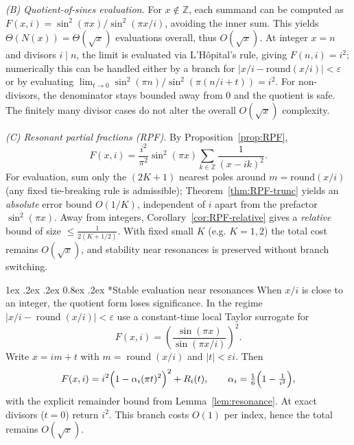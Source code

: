 \documentclass[11pt,a4paper]{amsart}
\makeatletter
\renewcommand\paragraph{\@startsection{paragraph}{4}{\z@}%
  {1ex \@plus .2ex \@minus .2ex}%
  {0.8ex \@plus .2ex}%
  {\normalfont\bfseries}}
\theoremstyle{plain}
\theoremstyle{definition}
\theoremstyle{remark}
\makeatother
\begin{document}
\smallskip
\noindent\textit{(B) Quotient-of-sines evaluation.}
For $x\notin\mathbb{Z}$, each summand can be computed as $F(x,i)=\sin^2(\pi x)/\sin^2(\pi x/i)$, avoiding the inner sum.
This yields $\Theta(N(x))=\Theta(\sqrt{x})$ evaluations overall, thus $O(\sqrt{x})$.
At integer $x=n$ and divisors $i\mid n$, the limit is evaluated via L’Hôpital’s rule, giving $F(n,i)=i^2$; numerically this can be handled either by a branch for $|x/i-\mathrm{round}(x/i)|<\varepsilon$ or by evaluating $\lim_{t\to0}\sin^2(\pi n)/\sin^2(\pi(n/i+t))=i^2$.
For non-divisors, the denominator stays bounded away from $0$ and the quotient is safe.
The finitely many divisor cases do not alter the overall $O(\sqrt{x})$ complexity.

\smallskip
\noindent\textit{(C) Resonant partial fractions (RPF).}
By Proposition~\ref{prop:RPF},
\[
F(x,i)=\frac{i^{2}}{\pi^{2}}\sin^{2}(\pi x)\sum_{k\in\mathbb{Z}}\frac{1}{(x-ik)^{2}}.
\]
For evaluation, sum only the $(2K{+}1)$ nearest poles around $m=\mathrm{round}(x/i)$ (any fixed tie-breaking rule is admissible); Theorem~\ref{thm:RPF-trunc} yields an \emph{absolute} error bound $O(1/K)$, independent of $i$ apart from the prefactor $\sin^{2}(\pi x)$.  
Away from integers, Corollary~\ref{cor:RPF-relative} gives a \emph{relative} bound of size $\le \frac{1}{2(K+1/2)}$. With fixed small $K$ (e.g. $K=1,2$) the total cost remains $O(\sqrt{x})$, and stability near resonances is preserved without branch switching.

\paragraph*{Stable evaluation near resonances}
When $x/i$ is close to an integer, the quotient form loses significance. In the regime $\bigl|x/i-\operatorname{round}(x/i)\bigr|<\varepsilon$ use a constant-time local Taylor surrogate for 
\[
F(x,i)=\left(\frac{\sin(\pi x)}{\sin(\pi x/i)}\right)^{\!2}.
\]
Write $x=im+t$ with $m=\operatorname{round}(x/i)$ and $|t|<\varepsilon i$. Then
\[
F(x,i)=i^2\Bigl(1-\alpha_i(\pi t)^2\Bigr)^2+R_i(t),\qquad 
\alpha_i=\tfrac{1}{6}\Bigl(1-\tfrac{1}{i^2}\Bigr),
\]
with the explicit remainder bound from Lemma~\ref{lem:resonance}. At exact divisors ($t=0$) return $i^2$. This branch costs $O(1)$ per index, hence the total remains $O(\sqrt{x})$.
\end{document}
